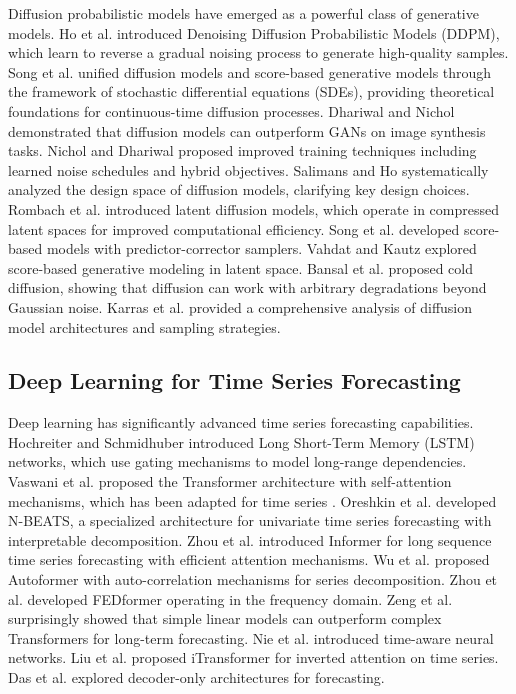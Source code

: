 \documentclass[11pt,a4paper]{article}
\begin{document}
Diffusion probabilistic models have emerged as a powerful class of generative models. Ho et al. \cite{ho2020denoising} introduced Denoising Diffusion Probabilistic Models (DDPM), which learn to reverse a gradual noising process to generate high-quality samples. Song et al. \cite{song2021scorebased} unified diffusion models and score-based generative models through the framework of stochastic differential equations (SDEs), providing theoretical foundations for continuous-time diffusion processes. Dhariwal and Nichol \cite{dhariwal2021diffusion} demonstrated that diffusion models can outperform GANs on image synthesis tasks. Nichol and Dhariwal \cite{nichol2021improved} proposed improved training techniques including learned noise schedules and hybrid objectives. Salimans and Ho \cite{salimans2022elucidating} systematically analyzed the design space of diffusion models, clarifying key design choices. Rombach et al. \cite{rombach2022latent} introduced latent diffusion models, which operate in compressed latent spaces for improved computational efficiency. Song et al. \cite{song2021denoising} developed score-based models with predictor-corrector samplers. Vahdat and Kautz \cite{vahdat2021scorebased} explored score-based generative modeling in latent space. Bansal et al. \cite{bansal2022cold} proposed cold diffusion, showing that diffusion can work with arbitrary degradations beyond Gaussian noise. Karras et al. \cite{karras2022elucidating} provided a comprehensive analysis of diffusion model architectures and sampling strategies.

\subsection{Deep Learning for Time Series Forecasting}

Deep learning has significantly advanced time series forecasting capabilities. Hochreiter and Schmidhuber \cite{hochreiter1997lstm} introduced Long Short-Term Memory (LSTM) networks, which use gating mechanisms to model long-range dependencies. Vaswani et al. \cite{vaswani2017attention} proposed the Transformer architecture with self-attention mechanisms, which has been adapted for time series \cite{zhou2021informer}. Oreshkin et al. \cite{oreshkin2019nbeats} developed N-BEATS, a specialized architecture for univariate time series forecasting with interpretable decomposition. Zhou et al. \cite{zhou2021informer} introduced Informer for long sequence time series forecasting with efficient attention mechanisms. Wu et al. \cite{wu2021autoformer} proposed Autoformer with auto-correlation mechanisms for series decomposition. Zhou et al. \cite{zhou2022fedformer} developed FEDformer operating in the frequency domain. Zeng et al. \cite{zeng2023transformers} surprisingly showed that simple linear models can outperform complex Transformers for long-term forecasting. Nie et al. \cite{nie2023timenet} introduced time-aware neural networks. Liu et al. \cite{liu2023itransformer} proposed iTransformer for inverted attention on time series. Das et al. \cite{das2023decoder} explored decoder-only architectures for forecasting.
\end{document}

